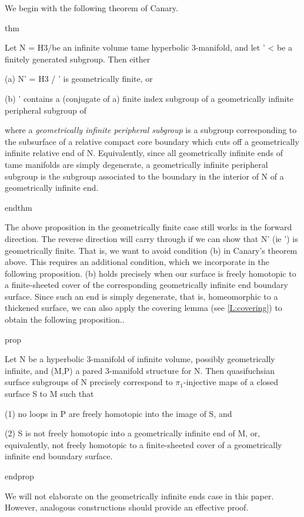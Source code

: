 We begin with the following theorem of Canary.

thm

Let N = H3/\Ga be an infinite volume tame hyperbolic 3-manifold, and let
\Ga' < \Ga be a finitely generated subgroup. Then either

(a) N' = H3 / \Ga' is geometrically finite, or

(b) \Ga' contains a (conjugate of a) finite index subgroup of a geometrically
infinite peripheral subgroup of \Ga

where a \emph{geometrically infinite peripheral subgroup} is a subgroup
corresponding to the subsurface of a relative compact core boundary which cuts
off a geometrically infinite relative end of N. Equivalently, since all
geometrically infinite ends of tame manifolds are simply degenerate,
a geometrically infinite peripheral subgroup is the subgroup associated to the
boundary in the interior of N of a geometrically infinite end.

endthm

The above proposition in the geometrically finite case still works in the
forward direction. The reverse direction will carry through if we can show that
N' (ie \Ga') is geometrically finite. That is, we want to avoid condition (b)
in Canary's theorem above. This requires an additional condition, which we
incorporate in the following proposition. (b) holds precisely when our surface
is freely homotopic to a finite-sheeted cover of the corresponding
geometrically infinite end boundary surface. Since such an end is simply
degenerate, that is, homeomorphic to a thickened surface, we can also apply the
covering lemma (see \ref{L:covering}) to obtain the following proposition..

prop

Let N be a hyperbolic 3-manifold of infinite volume, possibly geometrically
infinite, and (M,P) a pared 3-manifold structure for N. Then quasifuchsian
surface subgroups of N precisely correspond to $\pi_1$-injective maps of a closed
surface S to M such that

(1) no loops in P are freely homotopic into the image of S, and

(2) S is not freely homotopic into a geometrically infinite end of M, or,
equivalently, not freely homotopic to a finite-sheeted cover of a geometrically
infinite end boundary surface.

endprop

We will not elaborate on the geometrically infinite ends case in this paper.
However, analogous constructions should provide an effective proof.

